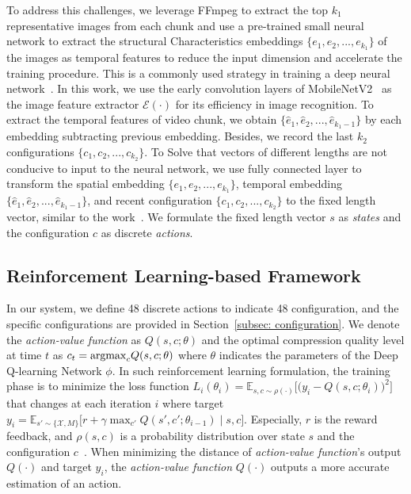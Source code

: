 To address this challenges, we leverage FFmpeg \cite{FFmpeg} to extract the top $k_1$ representative images from each chunk and use a pre-trained small neural network to extract the structural Characteristics embeddings $ \{e_1,e_2,...,e_{k_1}\} $ of the images as temporal features to reduce the input dimension and accelerate the training procedure. This is a commonly used strategy in training a deep neural network~\cite{finetunning,finetunning2}. In this work, we use the early convolution layers of MobileNetV2~\cite{MobileNetV2} as the image feature extractor $ \mathcal{E}(\cdot) $ for its efficiency in image recognition. To extract the temporal features of video chunk, we obtain $ \{\hat{e}_1,\hat{e}_2,...,\hat{e}_{{k_1}-1}\} $ by each embedding subtracting previous embedding. Besides, we record the last $k_2$ configurations $ \{c_1,c_2,...,c_{k_2}\} $. To Solve that vectors of different lengths are not conducive to input to the neural network, we use fully connected layer to transform the spatial embedding $ \{e_1,e_2,...,e_{k_1}\} $, temporal embedding $ \{\hat{e}_1,\hat{e}_2,...,\hat{e}_{{k_1}-1}\} $, and recent configuration $ \{c_1,c_2,...,c_{k_2}\} $ to the fixed length vector, similar to the work~\cite{pensieve}. We formulate the fixed length vector $ s $ as \emph{states} and the configuration $ c $ as discrete \emph{actions}.

\subsection{Reinforcement Learning-based Framework}

In our system, we define 48 discrete actions to indicate 48 configuration, and the specific configurations are provided in Section~\ref{subsec: configuration}. We denote the \emph{action-value function} as $ Q(s, c; \theta) $ and the optimal compression quality level at time $ t $ as $  c_t = {\rm argmax}_cQ(s, c; \theta) $ where $ \theta $ indicates the parameters of the Deep Q-learning Network $ \phi $. In such reinforcement learning formulation, the training phase is to minimize the loss function $ L_i(\theta_i) = \mathbb{E}_{s, c \sim \rho (\cdot)}\Big[\big(y_i - Q(s, c; \theta_i)\big)^2 \Big] $ that changes at each iteration $ i $ where target $ y_i = \mathbb{E}_{s' \sim \{\mathcal{X}, M\}} \big[ r + \gamma \max_{c'} Q(s', c'; \theta_{i-1}) \mid s, c \big] $. Especially, $ r $ is the reward feedback, and $ \rho(s, c) $ is a probability distribution over state  $ s $ and the configuration $ c $~\cite{DQN}. When minimizing the distance of \emph{action-value function}'s output $ Q(\cdot) $ and target $ y_i $, the \emph{action-value function} $ Q(\cdot) $ outputs a more accurate estimation of an action. 

